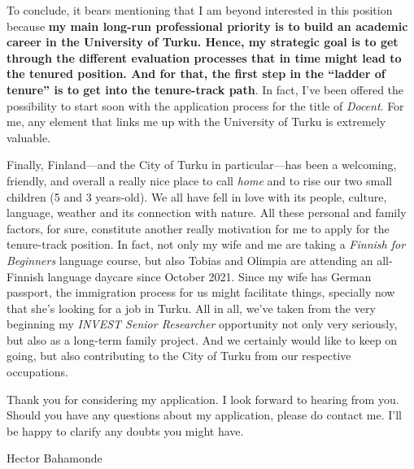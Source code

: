 \documentclass[10pt,stdletter,dateno,sigleft]{newlfm} %
\begin{document}
\begin{newlfm}
To conclude, it bears mentioning that I am beyond interested in this position because {\bf my main long-run professional priority is to build an academic career in the University of Turku.  Hence, my strategic goal is to get through the different evaluation processes that in time might lead to the tenured position. And for that, the first step in the ``ladder of tenure'' is to get into the tenure-track path}. In fact, I've been offered the possibility to start soon with the application process for the title of \emph{Docent}. For me, any element that links me up with the University of Turku is extremely valuable. 

Finally, Finland---and the City of Turku in particular---has been a welcoming, friendly, and overall a really nice place to call \emph{home} and to rise our two small children (5 and 3 years-old). We all have fell in love with its people, culture, language, weather and its connection with nature. All these personal and family factors, for sure, constitute another really motivation for me to apply for the tenure-track position. In fact, not only my wife and me are taking a \emph{Finnish for Beginners} language course, but also Tobias and Olimpia are attending an all-Finnish language daycare since October 2021. Since my wife has German passport, the immigration process for us might facilitate things, specially now that she's looking for a job in Turku. All in all, we've taken from the very beginning my \emph{INVEST Senior Researcher} opportunity not only very seriously, but also as a long-term family project. And we certainly would like to keep on going, but also contributing to the City of Turku from our respective occupations.

Thank you for considering my application. I look forward to hearing from you. Should you have any questions about my application, please do contact me. I'll be happy to clarify any doubts you might have.




\vspace{3cm}

{\hspace{12cm}Hector Bahamonde}



\end{newlfm}
\end{document}
